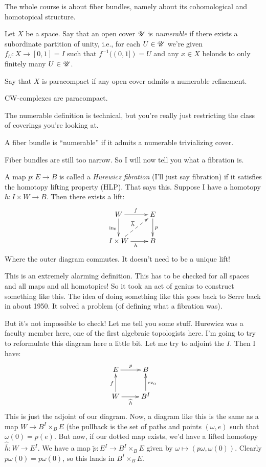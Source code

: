 The whole course is about fiber bundles, namely about its cohomological and homotopical structure.

\begin{definition}
   Let $X$ be a space. Say that an open cover $\mathscr U$ is \emph{numerable} if there exists a subordinate partition of unity, i.e., for each $U\in\mathscr U$ we're given $f_U:X\to [0,1]=I$ such that $f^{-1}((0,1]) = U$ and any $x\in X$ belonds to only finitely many $U\in\mathscr U$.

    Say that $X$ is paracompact if any open cover admits a numerable refinement.
\end{definition}
\begin{example}
    CW-complexes are paracompact.
\end{example}
The numerable definition is technical, but you're really just restricting the class of coverings you're looking at.
\begin{definition}
    A fiber bundle is ``numerable'' if it admits a numerable trivializing cover.
\end{definition}

Fiber bundles are still too narrow. So I will now tell you what a fibration is.

\begin{definition}
    A map $p:E\to B$ is called a \emph{Hurewicz fibration} (I'll just say fibration) if it satisfies the homotopy lifting property (HLP). That says this. Suppose I have a homotopy $h:I\times W\to B$. Then there exists a lift:
    \begin{equation*}
	\xymatrix{
	    W\ar[r]^f\ar[d]_{\mathrm{in}_0} & E\ar[d]^p\\
	    I\times W\ar[r]_h\ar@{-->}[ur]^{\overline{h}} & B
	    }
    \end{equation*}
    Where the outer diagram commutes. It doesn't need to be a unique lift!
\end{definition}
This is an extremely alarming definition. This has to be checked for all spaces and all maps and all homotopies! So it took an act of genius to construct something like this. The idea of doing something like this goes back to Serre back in about 1950. It solved a problem (of defining what a fibration was).

But it's not impossible to check! Let me tell you some stuff. Hurewicz was a faculty member here, one of the first algebraic topologists here. I'm going to try to reformulate this diagram here a little bit. Let me try to adjoint the $I$. Then I have:
\begin{equation*}
    \xymatrix{
	E\ar[r]^p & B\\
	W\ar[u]^f\ar[r]_{\widehat{h}} & B^I\ar[u]_{\mathrm{ev}_0}
    }
\end{equation*}
This is just the adjoint of our diagram. Now, a diagram like this is the same as a map $W\to B^I\times_B E$ (the pullback is the set of paths and points $(\omega, e)$ such that $\omega(0) = p(e)$. But now, if our dotted map exists, we'd have a lifted homotopy $\widehat{\overline{h}}:W\to E^I$. We have a map $\widetilde{p}:E^I\to B^I\times_B E$ given by $\omega\mapsto (p\omega,\omega(0))$. Clearly $p\omega(0) = p\omega(0)$, so this lands in $B^I\times_B E$.

